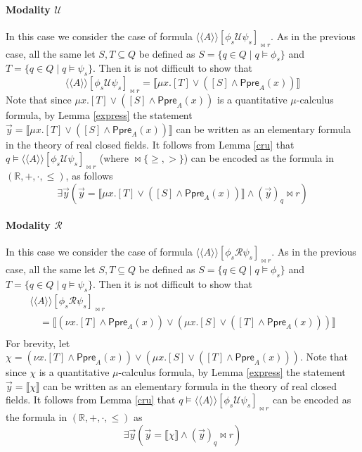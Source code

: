 \documentclass[times, 10 pt,twocolumn]{article}
\newcommand{\mb}[1]{\mathbb{#1}}
\newcommand{\mc}[1]{\mathcal{#1}}
\newcommand{\lla}{\langle\langle}
\newcommand{\rra}{\rangle\rangle}
\newcommand{\lb}{\llbracket}
\newcommand{\rb}{\rrbracket}
\newcommand{\Ppre}{\textsf{Ppre}}
\begin{document}
\paragraph{Modality $\mc{U}$} In this case we consider the case
of formula $\lla A\rra [\phi_s\mc{U}\psi_s]_{\bowtie r}$. As in
the previous case, all the same %
let $S, T\subseteq Q$ be defined as $S= \{q\in Q\mid q\models
\phi_s\}$ and $T= \{q\in Q\mid q\models \psi_s\}$. Then it is not
difficult to show that
  \[
  \lla A\rra [\phi_s\mc{U}\psi_s]_{\bowtie r}=\lb \mu x. [T]\vee ([S]\wedge \Ppre_A(x) ) \rb
  \]
Note that since $\mu x. [T]\vee ([S]\wedge \Ppre_A(x) ) $ is a
quantitative $\mu$-calculus formula, by Lemma \ref{express} the
statement $\vec{y}=\lb \mu x. [T]\vee ([S]\wedge \Ppre_A(x) ) \rb$
can be written as an elementary formula in the theory of real
closed fields. It follows from Lemma \ref{cru} that $q\models \lla
A\rra[\phi_s\mc{U}\psi_s]_{\bowtie r}$ (where $\bowtie \{\geq,
>\}$) can be encoded as the formula in $(\mb{R}, +, \cdot, \leq)$,
as follows
\begin{equation} \label{eqn2}
\exists \vec{y} (\vec{y}=\lb\mu x. [T]\vee ([S]\wedge \Ppre_A(x) )
\rb \wedge (\vec{y})_q \bowtie r)\end{equation}

\paragraph{Modality $\mc{R}$} In this case we consider the case
of formula $\lla A\rra [\phi_s\mc{R}\psi_s]_{\bowtie r}$. As in
the previous case, all the same let $S, T\subseteq Q$ be defined
as $S= \{q\in Q\mid q\models \phi_s\}$ and $T= \{q\in Q\mid
q\models \psi_s\}$. Then it is not difficult to show that
\[
\begin{array}{l}
  \lla A\rra [\phi_s\mc{R}\psi_s]_{\bowtie r} \\
  \quad =\lb (\nu x. [T]\wedge \Ppre_A(x)) \vee (\mu x. [S]\vee ([T]\wedge \Ppre_A(x)
  ))\rb \\
\end{array}
\]
For brevity, let $\chi=(\nu x. [T]\wedge \Ppre_A(x)) \vee (\mu x.
[S]\vee ([T]\wedge \Ppre_A(x) )) $.  Note that since $\chi$ is a
quantitative $\mu$-calculus formula, by Lemma \ref{express} the
statement $\vec{y}=\lb \chi\rb$ can be written as an elementary
formula in the theory of real closed fields. It follows from Lemma
\ref{cru} that $q\models \lla A\rra[\phi_s\mc{U}\psi_s]_{\bowtie
r}$ can be encoded as the formula in $(\mb{R}, +, \cdot, \leq)$ as
\begin{equation}
\label{eqn3} \exists \vec{y} (\vec{y}=\lb\chi\rb \wedge
(\vec{y})_q \bowtie r)
\end{equation}
\end{document}
